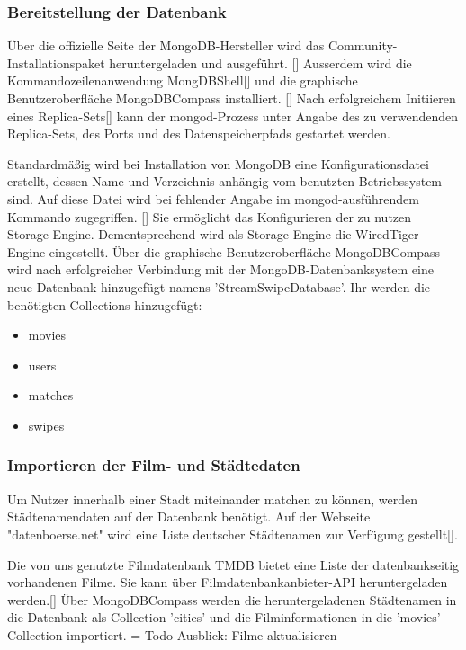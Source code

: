 \subsubsection{Bereitstellung der Datenbank}
Über die offizielle Seite der MongoDB-Hersteller wird das Community-Installationspaket heruntergeladen und ausgeführt. []
Ausserdem wird die Kommandozeilenanwendung MongDBShell[] und die
graphische Benutzeroberfläche MongoDBCompass installiert. []
Nach erfolgreichem Initiieren eines Replica-Sets[]
kann der mongod-Prozess unter Angabe des zu verwendenden Replica-Sets, des Ports und des Datenspeicherpfads gestartet werden. \newline



Standardmäßig wird bei Installation von MongoDB eine Konfigurationsdatei erstellt, dessen Name und Verzeichnis anhängig vom benutzten Betriebssystem sind. Auf diese Datei wird bei fehlender Angabe im mongod-ausführendem Kommando zugegriffen. [] 
Sie ermöglicht das Konfigurieren der zu nutzen Storage-Engine. Dementsprechend wird als Storage Engine die WiredTiger-Engine eingestellt. 
Über die graphische Benutzeroberfläche MongoDBCompass wird nach erfolgreicher Verbindung mit der MongoDB-Datenbanksystem eine neue Datenbank hinzugefügt namens 'StreamSwipeDatabase'. Ihr werden die benötigten Collections hinzugefügt:

\begin{itemize}
\item movies
\item users
\item matches
\item swipes
\end{itemize}

\subsubsection{Importieren der Film- und Städtedaten}
Um Nutzer innerhalb einer Stadt miteinander matchen zu können, werden Städtenamendaten auf der Datenbank benötigt. Auf der Webseite "datenboerse.net" wird eine Liste deutscher Städtenamen zur Verfügung gestellt[].\newline


Die von uns genutzte Filmdatenbank TMDB bietet eine Liste der datenbankseitig vorhandenen Filme. Sie kann über Filmdatenbankanbieter-API heruntergeladen werden.[]
\newline
Über MongoDBCompass werden die heruntergeladenen Städtenamen in die Datenbank als Collection 'cities' und die Filminformationen in die 'movies'-Collection importiert.
\newline
=\> Todo Ausblick: Filme aktualisieren
